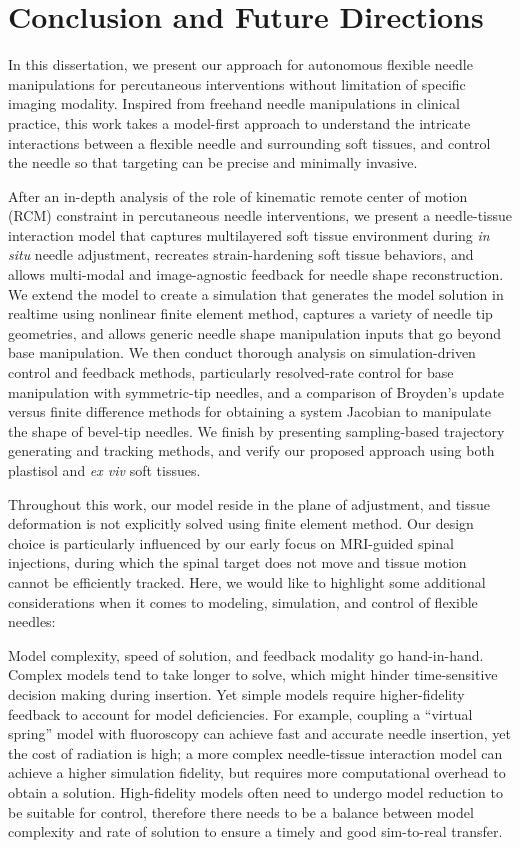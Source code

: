 \chapter{Conclusion and Future Directions}
\label{chap:chap-6}

In this dissertation, we present our approach for autonomous flexible needle manipulations for percutaneous interventions without limitation of specific imaging modality. Inspired from freehand needle manipulations in clinical practice, this work takes a model-first approach to understand the intricate interactions between a flexible needle and surrounding soft tissues, and control the needle so that targeting can be precise and minimally invasive.

After an in-depth analysis of the role of kinematic remote center of motion (RCM) constraint in percutaneous needle interventions, we present a needle-tissue interaction model that captures multilayered soft tissue environment during \textit{in situ} needle adjustment, recreates strain-hardening soft tissue behaviors, and allows multi-modal and image-agnostic feedback for needle shape reconstruction. We extend the model to create a simulation that generates the model solution in realtime using nonlinear finite element method, captures a variety of needle tip geometries, and allows generic needle shape manipulation inputs that go beyond base manipulation. We then conduct thorough analysis on simulation-driven control and feedback methods, particularly resolved-rate control for base manipulation with symmetric-tip needles, and a comparison of Broyden's update versus finite difference methods for obtaining a system Jacobian to manipulate the shape of bevel-tip needles. We finish by presenting sampling-based trajectory generating and tracking methods, and verify our proposed approach using both plastisol and \textit{ex viv} soft tissues.

Throughout this work, our model reside in the plane of adjustment, and tissue deformation is not explicitly solved using finite element method. Our design choice is particularly influenced by our early focus on MRI-guided spinal injections, during which the spinal target does not move and tissue motion cannot be efficiently tracked. Here, we would like to highlight some additional considerations when it comes to modeling, simulation, and control of flexible needles:

Model complexity, speed of solution, and feedback modality go hand-in-hand. Complex models tend to take longer to solve, which might hinder time-sensitive decision making during insertion. Yet simple models require higher-fidelity feedback to account for model deficiencies. For example, coupling a ``virtual spring'' model with fluoroscopy can achieve fast and accurate needle insertion, yet the cost of radiation is high; a more complex needle-tissue interaction model can achieve a higher simulation fidelity, but requires more computational overhead to obtain a solution. High-fidelity models often need to undergo model reduction to be suitable for control, therefore there needs to be a balance between model complexity and rate of solution to ensure a timely and good sim-to-real transfer.

